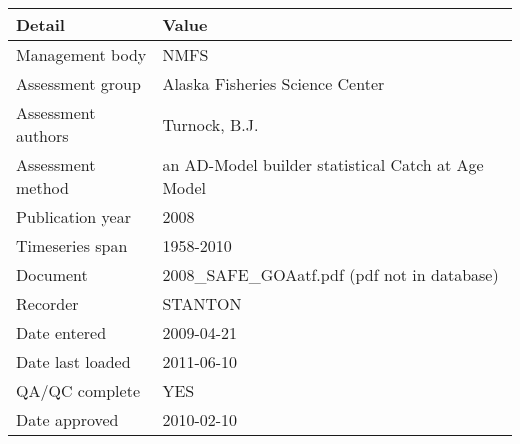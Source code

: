 \begin{table}[htb]
\centering
\begin{tabular}{lp{7cm}}
\toprule
Detail & Value \\
\midrule
Management body    & NMFS                                               \\
Assessment group   & Alaska Fisheries Science Center                    \\
Assessment authors & Turnock, B.J.                                      \\
Assessment method  & an AD-Model builder statistical Catch at Age Model \\
Publication year   & 2008                                               \\
Timeseries span    & 1958-2010                                          \\
Document           & 2008\_SAFE\_GOAatf.pdf (pdf not in database)       \\
Recorder           & STANTON                                            \\
Date entered       & 2009-04-21                                         \\
Date last loaded   & 2011-06-10                                         \\
QA/QC complete     & YES                                                \\
Date approved      & 2010-02-10                                         \\
\bottomrule
\end{tabular}
\label{tab:assessdet}
\end{table}
